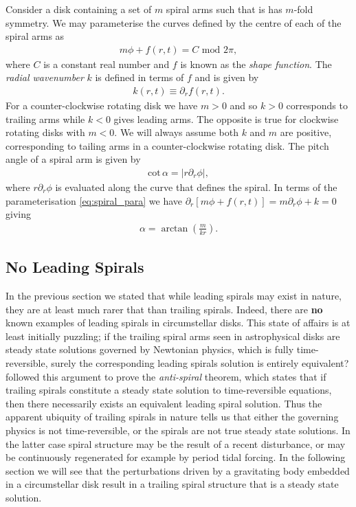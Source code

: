 Consider a disk containing a set of $m$ spiral arms such that is has $m$-fold symmetry. We may parameterise the curves defined by the centre of each of the spiral arms as
\begin{align}
    m\phi + f(r,t) = C \,\, \mathrm{mod} \,\, 2\pi, \label{eq:spiral_para}
\end{align}
where $C$ is a constant real number and $f$ is known as the \textit{shape function}. The \textit{radial wavenumber} $k$ is defined in terms of $f$ and is given by
\begin{align}
    k(r,t) \equiv \partial_r f(r,t).
\end{align}
For a counter-clockwise rotating disk we have $m>0$ and so $k>0$ corresponds to trailing arms while $k<0$ gives leading arms. 
The opposite is true for clockwise rotating disks with $m<0$. 
We will always assume both $k$ and $m$ are positive, corresponding to tailing arms in a counter-clockwise rotating disk. 
The pitch angle of a spiral arm is given by
\begin{align}
    \mathrm{cot}\,\alpha = \left| r \partial_r \phi \right|,
\end{align}
where $r \partial_r \phi$ is evaluated along the curve that defines the spiral. In terms of the parameterisation \ref{eq:spiral_para} we have $\partial_r[m\phi+f(r,t)] = m \partial_r \phi + k = 0$ giving
\begin{align}
    \alpha = \arctan \left( \frac{m}{kr} \right). \label{eq:pitchangle}
\end{align}

\subsection{No Leading Spirals}

In the previous section we stated that while leading spirals may exist in nature, they are at least much rarer that than trailing spirals. 
Indeed, there are \textbf{no} known examples of leading spirals in circumstellar disks.
This state of affairs is at least initially puzzling; if the trailing spiral arms seen in astrophysical disks are steady state solutions governed by Newtonian physics, which is fully time-reversible, surely the corresponding leading spirals solution is entirely equivalent?
\citet{lynden-bell1967} followed this argument to prove the \textit{anti-spiral} theorem, which states that if trailing spirals constitute a steady state solution to time-reversible equations, then there necessarily exists an equivalent leading spiral solution.
Thus the apparent ubiquity of trailing spirals in nature tells us that either the governing physics is not time-reversible, or the spirals are not true steady state solutions.
In the latter case spiral structure may be the result of a recent disturbance, or may be continuously regenerated for example by period tidal forcing.
In the following section we will see that the perturbations driven by a gravitating body embedded in a circumstellar disk result in a trailing spiral structure that is a steady state solution.


